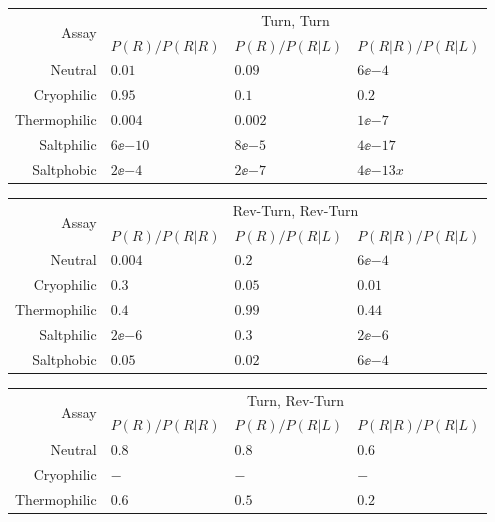 \documentclass[12pt]{article}
\begin{document}
\begin{table}
  \begin{center}
  \begin{tabular}{|r|l|l|l|}
    \hline
    \multirow{2}{*}{Assay} & \multicolumn{3}{|c|}{Turn, Turn} \\
      \cline{2-4}
      & $P(R)/P(R|R)$ & $P(R)/P(R|L)$ & $P(R|R)/P(R|L)$ \\
    \hline
    Neutral      & $0.01$ & $0.09$ & $6\ee{-4}$ \\
    Cryophilic   & $0.95$ & $0.1$ & $0.2$ \\
    Thermophilic & $0.004$ & $0.002$ & $1\ee{-7}$ \\
    Saltphilic   & $6\ee{-10}$ & $8\ee{-5}$ & $4\ee{-17}$ \\
    Saltphobic   & $2\ee{-4}$ & $2\ee{-7}$ & $4\ee{-13}x$ \\
    \hline
  \end{tabular}
  \begin{tabular}{|r|l|l|l|}
    \hline
    \multirow{2}{*}{Assay} & \multicolumn{3}{|c|}{Rev-Turn, Rev-Turn} \\
      \cline{2-4}
      & $P(R)/P(R|R)$ & $P(R)/P(R|L)$ & $P(R|R)/P(R|L)$ \\
    \hline
    Neutral      & $0.004$ & $0.2$ & $6\ee{-4}$ \\
    Cryophilic   & $0.3$ & $0.05$ & $0.01$ \\
    Thermophilic & $0.4$ & $0.99$ & $0.44$ \\
    Saltphilic   & $2\ee{-6}$ & $0.3$ & $2\ee{-6}$ \\
    Saltphobic   & $0.05$ & $0.02$ & $6\ee{-4}$ \\
    \hline
  \end{tabular}
  \begin{tabular}{|r|l|l|l|}
    \hline
    \multirow{2}{*}{Assay} & \multicolumn{3}{|c|}{Turn, Rev-Turn} \\
      \cline{2-4}
      & $P(R)/P(R|R)$ & $P(R)/P(R|L)$ & $P(R|R)/P(R|L)$ \\
    \hline
    Neutral      & $0.8$ & $0.8$ & $0.6$ \\
    Cryophilic   & $-$ & $-$ & $-$ \\
    Thermophilic & $0.6$ & $0.5$ & $0.2$ \\

\end{tabular}
\end{center}
\end{table}
\end{document}
